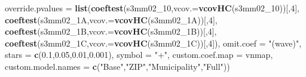 \documentclass[
]{article}
\newenvironment{Shaded}{\begin{snugshade}}{\end{snugshade}}
\newcommand{\DataTypeTok}[1]{\textcolor[rgb]{0.13,0.29,0.53}{#1}}
\newcommand{\DecValTok}[1]{\textcolor[rgb]{0.00,0.00,0.81}{#1}}
\newcommand{\FloatTok}[1]{\textcolor[rgb]{0.00,0.00,0.81}{#1}}
\newcommand{\KeywordTok}[1]{\textcolor[rgb]{0.13,0.29,0.53}{\textbf{#1}}}
\newcommand{\NormalTok}[1]{#1}
\newcommand{\StringTok}[1]{\textcolor[rgb]{0.31,0.60,0.02}{#1}}
\begin{document}
\begin{Shaded}
\begin{Highlighting}[]
          \DataTypeTok{override.pvalues =} \KeywordTok{list}\NormalTok{(}\KeywordTok{coeftest}\NormalTok{(s3mm02_}\DecValTok{10}\NormalTok{,}\DataTypeTok{vcov.=}\KeywordTok{vcovHC}\NormalTok{(s3mm02_}\DecValTok{10}\NormalTok{))[,}\DecValTok{4}\NormalTok{],}
                                  \KeywordTok{coeftest}\NormalTok{(s3mm02_1A,}\DataTypeTok{vcov.=}\KeywordTok{vcovHC}\NormalTok{(s3mm02_1A))[,}\DecValTok{4}\NormalTok{],}
                                  \KeywordTok{coeftest}\NormalTok{(s3mm02_1B,}\DataTypeTok{vcov.=}\KeywordTok{vcovHC}\NormalTok{(s3mm02_1B))[,}\DecValTok{4}\NormalTok{],}
                                  \KeywordTok{coeftest}\NormalTok{(s3mm02_1C,}\DataTypeTok{vcov.=}\KeywordTok{vcovHC}\NormalTok{(s3mm02_1C))[,}\DecValTok{4}\NormalTok{]),}
          \DataTypeTok{omit.coef =} \StringTok{"(wave)"}\NormalTok{, }\DataTypeTok{stars =} \KeywordTok{c}\NormalTok{(}\FloatTok{0.1}\NormalTok{,}\FloatTok{0.05}\NormalTok{,}\FloatTok{0.01}\NormalTok{,}\FloatTok{0.001}\NormalTok{), }\DataTypeTok{symbol =} \StringTok{"+"}\NormalTok{,}
          \DataTypeTok{custom.coef.map =}\NormalTok{ vnmap, }
          \DataTypeTok{custom.model.names =} \KeywordTok{c}\NormalTok{(}\StringTok{"Base"}\NormalTok{,}\StringTok{"ZIP"}\NormalTok{,}\StringTok{"Municipality"}\NormalTok{,}\StringTok{"Full"}\NormalTok{))}
\end{Highlighting}
\end{Shaded}
\end{document}
